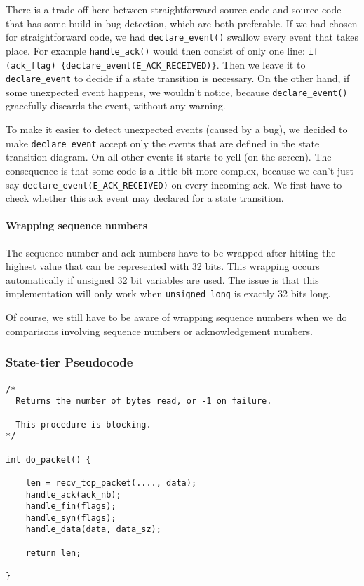 \documentclass[11pt]{article}
\begin{document}
    There is a trade-off here between straightforward source code and source 
    code that has some build in bug-detection, which are both preferable. If we 
    had chosen for straightforward code, we had \lstinline|declare_event()| swallow
    every event that takes place. For example \lstinline|handle_ack()| would then 
    consist of only one line: 
    \lstinline|if (ack_flag) {declare_event(E_ACK_RECEIVED)}|. Then we leave it to 
    \lstinline|declare_event| to decide if a state transition is necessary.
    On the other hand, if
    some unexpected event happens, we wouldn't notice, because 
    \lstinline|declare_event()| gracefully discards the event, without any warning.
    
    To make it easier to detect unexpected events (caused by a bug), we decided 
    to make \lstinline|declare_event| accept only the events that are defined in the
    state transition diagram. On all other events it starts to yell (on the 
    screen). The consequence is that some code is a little bit more complex, 
    because we can't just say \lstinline|declare_event(E_ACK_RECEIVED)|
    on every incoming ack. We first have to check whether this ack event may 
    declared for a state transition.
    
    
\paragraph{Wrapping sequence numbers}
    The sequence number and ack numbers have to be wrapped after hitting the 
    highest value that can be represented with 32 bits. This wrapping occurs 
    automatically if unsigned 32 bit variables are used. The issue is that 
    this implementation will only work when \lstinline|unsigned long| is 
    exactly 32 bits long.
    
    Of course, we still have to be aware of wrapping sequence numbers when we do
    comparisons involving sequence numbers or acknowledgement numbers.
    
    
\subsubsection{State-tier Pseudocode}


\paragraph{}


\begin{lstlisting}[title=Procedure do\_packet]
/*
  Returns the number of bytes read, or -1 on failure.

  This procedure is blocking.
*/

int do_packet() {

    len = recv_tcp_packet(...., data);
    handle_ack(ack_nb);
    handle_fin(flags);
    handle_syn(flags);
    handle_data(data, data_sz);

    return len;

}
\end{lstlisting}
\end{document}
